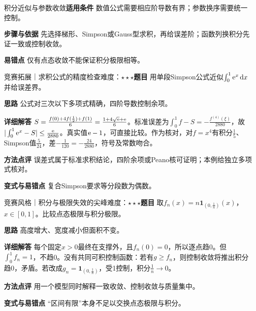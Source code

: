 \begin{method}{积分近似与参数收敛}\textbf{适用条件} 数值公式需要相应阶导数有界；参数换序需要统一控制。\par\textbf{步骤与依据} 先选择梯形、Simpson或Gauss型求积，再给误差阶；函数列换积分先证一致或控制收敛。\par\textbf{易错点} 仅有点态收敛不能保证积分极限相等。\end{method}

\begin{example}{竞赛拓展｜求积公式的精度检查}{难度：$\star\star\star$}\label{deep:ex:multiple_source_deep:simpson}\textbf{题目} 用单段Simpson公式近似$\int_0^1\mathrm{e}^x\mathop{}\!\mathrm{d} x$并给误差界。\par\textbf{思路} 公式对三次以下多项式精确，四阶导数控制余项。\par\textbf{详细解答} $S=\frac{f(0)+4f(\frac{1}{2})+f(1)}{6}=\frac{1+4\sqrt{\mathrm{e}}+\mathrm{e}}{6}$。标准误差为$\int_0^1f-S=-\frac{f^{(4)}(\xi)}{2880}$，故$|\int_0^1\mathrm{e}^x-S|\le\frac{\mathrm{e}}{2880}$。真实值$\mathrm{e}-1$，可直接比较。作为核对，对$f=x^4$有积分$\frac{1}{5}$、Simpson值$\frac{5}{24}$，差$-\frac{1}{120}=-\frac{24}{2880}$，符号及常数吻合。\par\textbf{方法点评} 误差式属于标准求积结论，四阶余项或Peano核可证明；本例给独立多项式核对。\par\textbf{变式与易错点} 复合Simpson要求等分段数为偶数。\end{example}

\begin{example}{竞赛风格｜积分与极限失效的尖峰}{难度：$\star\star\star$}\label{deep:ex:multiple_source_deep:badlimit}\textbf{题目} 取$f_n(x)=n\mathbf1_{(0,\frac{1}{n})}(x)$，$x\in[0,1]$。比较点态极限与积分极限。\par\textbf{思路} 高度增大、宽度减小但面积不变。\par\textbf{详细解答} 每个固定$x>0$最终在支撑外，且$f_n(0)=0$，所以逐点趋0。但$\int_0^1f_n=1$，不趋0。没有共同可积控制函数：若有$g\ge f_n$，则控制收敛将推出积分趋0，矛盾。若改成$g_n=\mathbf1_{(0,\frac{1}{n})}$，受1控制，积分$\frac{1}{n}\to0$。\par\textbf{方法点评} 用一个模型同时解释一致收敛、控制收敛与质量集中。\par\textbf{变式与易错点} “区间有限”本身不足以交换点态极限与积分。\end{example}
